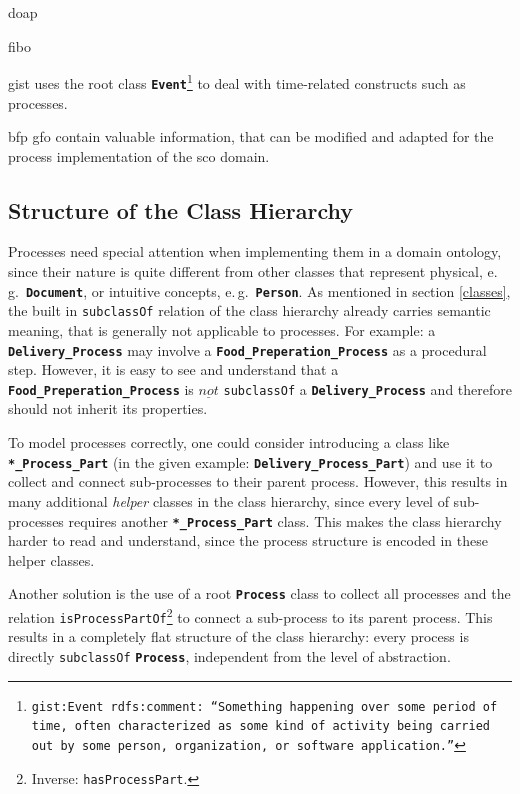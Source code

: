 \documentclass[a4paper, DIV=13, BCOR=0cm]{scrbook}
\newcommand{\eg}{e.\,g.\ }
\newcommand{\class}[1]{\texttt{\textbf{#1}}}
\newcommand{\relation}[1]{\texttt{#1}}
\newcommand{\foottt}[1]{\footnote{\texttt{#1}}}
\begin{document}
\gls{doap}

\gls{fibo}

\gls{gist} uses the root class \class{Event}\foottt{gist:Event rdfs:comment: \enquote{Something happening over some period of time, often characterized as some kind of activity being carried out by some person, organization, or software application.}} to deal with time-related constructs such as processes.

bfp gfo contain valuable information, that can be modified and adapted for the process implementation of the \gls{sco} domain.


\subsection{Structure of the Class Hierarchy}
\label{process-subclass}
Processes need special attention when implementing them in a domain ontology, since their nature is quite different from other classes that represent physical, \eg \class{Document}, or intuitive concepts, \eg \class{Person}. As mentioned in section \ref{classes}, the built in \relation{subclassOf} relation of the class hierarchy already carries semantic meaning, that is generally not applicable to processes. For example: a \class{Delivery\_Process} may involve a \class{Food\_Preperation\_Process} as a procedural step. However, it is easy to see and understand that a \class{Food\_Preperation\_Process} is $\underline{not}$ \relation{subclassOf} a \class{Delivery\_Process} and therefore should not inherit its properties.

To model processes correctly, one could consider introducing a class like \class{*\_Process\_Part} (in the given example: \class{Delivery\_Process\_Part}) and use it to collect and connect sub-processes to their parent process. However, this results in many additional \textit{helper} classes in the class hierarchy, since every level of sub-processes requires another \class{*\_Process\_Part} class. This makes the class hierarchy harder to read and understand, since the process structure is encoded in these helper classes.

Another solution is the use of a root \class{Process} class to collect all processes and the relation \relation{isProcessPartOf}\footnote{Inverse: \relation{hasProcessPart}.} to connect a sub-process to its parent process. This results in a completely flat structure of the class hierarchy: every process is directly \relation{subclassOf} \class{Process}, independent from the level of abstraction.
\end{document}
